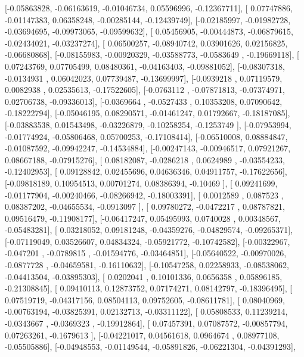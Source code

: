\documentclass{article}
\begin{document}
       [-0.05863828, -0.06163619, -0.01046734,  0.05596996, -0.12367711],
       [ 0.07747886, -0.01147383,  0.06358248, -0.00285144, -0.12439749],
       [-0.02185997, -0.01982728, -0.03694695, -0.09973065, -0.09599632],
       [ 0.05456905, -0.00444873, -0.06879615, -0.02434021, -0.03237274],
       [ 0.06500257, -0.08940742,  0.03901626,  0.02156825, -0.06680868],
       [-0.08155983, -0.00920329, -0.03588773, -0.0583649 , -0.19669118],
       [ 0.07243769,  0.07705499,  0.08480361, -0.04163403, -0.09881052],
       [-0.08307318, -0.0134931 ,  0.06042023,  0.07739487, -0.13699997],
       [-0.0939218 ,  0.07119579,  0.0082938 ,  0.02535613, -0.17522605],
       [-0.0763112 , -0.07871813, -0.07374971,  0.02706738, -0.09336013],
       [-0.0369664 , -0.0527433 ,  0.10353208,  0.07090642, -0.18222794],
       [-0.05046195,  0.08290571, -0.01461247,  0.01792667, -0.18187085],
       [-0.03883538,  0.01543498, -0.03226879, -0.10258254, -0.1253749 ],
       [-0.07953994, -0.01774924, -0.05806468,  0.05700253, -0.17108414],
       [-0.06510008,  0.08884847, -0.01087592, -0.09942247, -0.14534884],
       [-0.00247143, -0.00946517,  0.07921267,  0.08667188, -0.07915276],
       [ 0.08182087, -0.0286218 ,  0.0624989 , -0.03554233, -0.12402953],
       [ 0.09128842,  0.02455696,  0.04636346,  0.04911757, -0.17622656],
       [-0.09818189,  0.10954513,  0.00701274,  0.08386394, -0.10469   ],
       [ 0.09241699, -0.01177904, -0.00240466, -0.08266942, -0.18003391],
       [ 0.0012589 ,  0.087523  ,  0.08387202, -0.04655534, -0.0913097 ],
       [ 0.09780272, -0.0472217 ,  0.08787821,  0.09516479, -0.11908177],
       [-0.06417247,  0.05495993,  0.0740028 ,  0.00348567, -0.05483281],
       [ 0.03218052,  0.09181248, -0.04359276, -0.04829574, -0.09265371],
       [-0.07119049,  0.03526607,  0.04834324, -0.05921772, -0.10742582],
       [-0.00322967, -0.047201  , -0.0789815 , -0.01594776, -0.03464851],
       [-0.05640522, -0.00970026, -0.0877728 , -0.04659581, -0.16110632],
       [-0.10547258,  0.02258933, -0.08538062, -0.04413504, -0.03895303],
       [ 0.0202041 ,  0.10101336,  0.0656358 ,  0.05896185, -0.21308845],
       [ 0.09410113,  0.12873752,  0.07174271,  0.08142797, -0.18396495],
       [ 0.07519719, -0.04317156,  0.08504113,  0.09752605, -0.08611781],
       [ 0.08040969, -0.00763194, -0.03825391,  0.02132713, -0.03311122],
       [ 0.05808533,  0.11239214, -0.0343667 , -0.0369323 , -0.19912864],
       [ 0.07457391,  0.07087572, -0.00857794,  0.07263261, -0.1679613 ],
       [-0.04221017,  0.04561618,  0.0964674 ,  0.08977108, -0.05505886],
       [-0.04948553, -0.01149544, -0.05891826, -0.06221304, -0.04391293],
\end{document}
